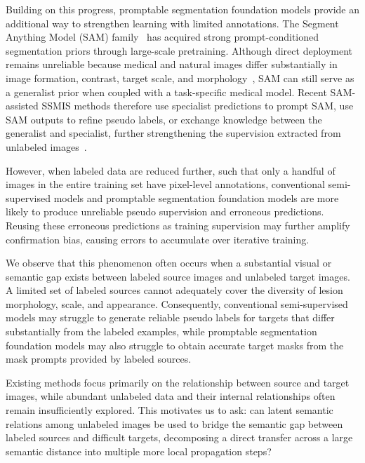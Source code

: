 \documentclass[a4paper,fleqn]{cas-dc}
\begin{document}
Building on this progress, promptable segmentation foundation models provide an additional way to strengthen learning with limited annotations. The Segment Anything Model (SAM) family~\cite{kirillov2023segment,ravi2025sam2,carion2026sam3} has acquired strong prompt-conditioned segmentation priors through large-scale pretraining. Although direct deployment remains unreliable because medical and natural images differ substantially in image formation, contrast, target scale, and morphology~\cite{mazurowski2023samexperiment,ma2024medsam}, SAM can still serve as a generalist prior when coupled with a task-specific medical model. Recent SAM-assisted SSMIS methods therefore use specialist predictions to prompt SAM, use SAM outputs to refine pseudo labels, or exchange knowledge between the generalist and specialist, further strengthening the supervision extracted from unlabeled images~\cite{zhang2023semisam,zhang2025semisamplus,xu2024samatch,miao2024cpcsam,vu2026scsam,zhang2026cppssam}.

However, when labeled data are reduced further, such that only a handful of images in the entire training set have pixel-level annotations, conventional semi-supervised models and promptable segmentation foundation models are more likely to produce unreliable pseudo supervision and erroneous predictions. Reusing these erroneous predictions as training supervision may further amplify confirmation bias, causing errors to accumulate over iterative training.

We observe that this phenomenon often occurs when a substantial visual or semantic gap exists between labeled source images and unlabeled target images. A limited set of labeled sources cannot adequately cover the diversity of lesion morphology, scale, and appearance. Consequently, conventional semi-supervised models may struggle to generate reliable pseudo labels for targets that differ substantially from the labeled examples, while promptable segmentation foundation models may also struggle to obtain accurate target masks from the mask prompts provided by labeled sources.

Existing methods focus primarily on the relationship between source and target images, while abundant unlabeled data and their internal relationships often remain insufficiently explored. This motivates us to ask: can latent semantic relations among unlabeled images be used to bridge the semantic gap between labeled sources and difficult targets, decomposing a direct transfer across a large semantic distance into multiple more local propagation steps?
\end{document}
